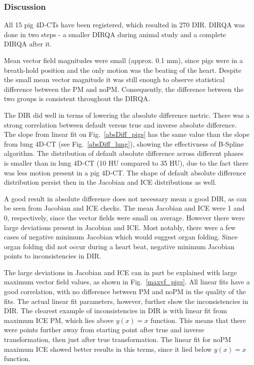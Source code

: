 \documentclass[type=dr, dr=rernat, accentcolor=tud7b,colorbacktitle, bigchapter, openright, twoside, 12pt ]{tudthesis}
\begin{document}
\subsubsection{Discussion}

All 15 pig 4D-CTs have been registered, which resulted in 270 DIR. DIRQA was done in two steps - a smaller DIRQA during animal study and a complete DIRQA after it.

Mean vector field magnitudes were small (approx. 0.1 mm), since pigs were in a breath-hold position and the only motion was the beating of the heart. 
Despite the small mean vector magnitude it was still enough to observe statistical difference between the PM and noPM.
Consequently, the difference between the two groups is consistent throughout the DIRQA.

The DIR did well in terms of lowering the absolute difference metric. There was a strong correlation between default versus true and inverse absolute difference. 
The slope from linear fit on Fig.~\ref{absDiff_pigs} has the same value than the slope from lung 4D-CT (see Fig.~\ref{absDiff_lung}), showing
the effectivness of B-Spline algorithm. The distribution of default absolute difference across different phases is smaller than in lung 4D-CT (10 HU compared to 35 HU), due to the fact
there was less motion present in a pig 4D-CT. The shape of default absolute difference
distribution persist then in the Jacobian and ICE distributions as well. 

A good result in absolute difference does not necessary mean a good DIR, as can be seen from Jacobian and ICE checks. The mean Jacobian and ICE were 1 and 0, respectively, since the
vector fields were small on average. However there were large deviations present in Jacobian and ICE. Most notably, there were a few cases of negative minimum Jacobian which would suggest 
organ folding. Since organ folding did not occur during a heart beat, negative minimum Jacobian points to inconsistencies in DIR. 

The large deviations in Jacobian and ICE can in part be explained with large maximum vector field values, as shown in Fig.~\ref{maxvf_pigs}. All linear fits have a good correlation, with no
difference between PM and noPM in the quality of the fits. The actual linear fit parameters, however, further show the inconsistencies in DIR. The clearest example of inconsistencies in
DIR is with linear fit from maximum ICE PM, which lies above $y(x)=x$ function. This means that there were points further away from starting point after true and inverse transformation, 
then just after true transformation. The linear fit for noPM maximum ICE showed better results in this terms, since it lied below $y(x)=x$ function.
\end{document}
